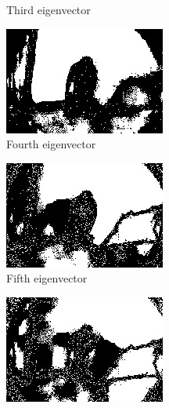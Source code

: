 \documentclass[11pt]{article}
\begin{document}
\begin{figure}
\begin{subfigure}[b]{0.4\textwidth}
\caption{Third eigenvector}
\label{fig:ev3:r5}
\end{subfigure}
\begin{subfigure}[b]{0.4\textwidth}
\centering
\includegraphics[width=\textwidth]{hawk_5_seg_ev4}
\caption{Fourth eigenvector}
\label{fig:ev4:r5}
\end{subfigure}
\begin{subfigure}[b]{0.4\textwidth}
\centering
\includegraphics[width=\textwidth]{hawk_5_seg_ev5}
\caption{Fifth eigenvector}
\label{fig:ev5:r5}
\end{subfigure}
\begin{subfigure}[b]{0.4\textwidth}
\centering
\includegraphics[width=\textwidth]{hawk_5_seg_ev6}

\end{subfigure}
\end{figure}
\end{document}

